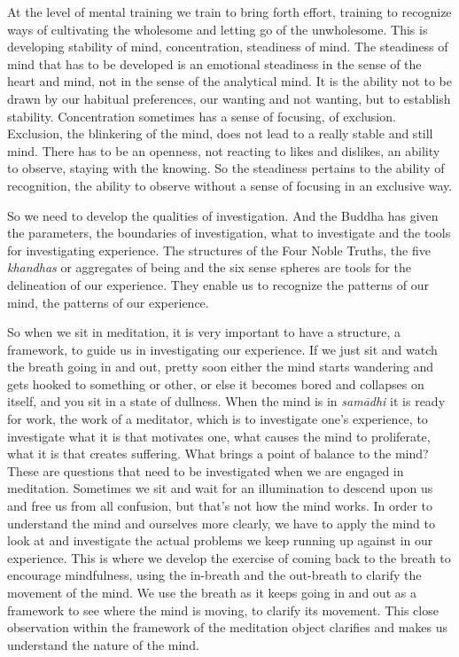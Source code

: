 At the level of mental training we train to bring forth effort, training
to recognize ways of cultivating the wholesome and letting go of the
unwholesome. This is developing stability of mind, concentration, 
steadiness of mind. The steadiness of mind that has to be developed is
an emotional steadiness in the sense of the heart and mind, not in the
sense of the analytical mind. It is the ability not to be drawn by our
habitual preferences, our wanting and not wanting, but to establish
stability. Concentration sometimes has a sense of focusing, of
exclusion. Exclusion, the blinkering of the mind, does not lead to a
really stable and still mind. There has to be an openness, not reacting
to likes and dislikes, an ability to observe, staying with the knowing. 
So the steadiness pertains to the ability of recognition, the ability to
observe without a sense of focusing in an exclusive way. 

So we need to develop the qualities of investigation. And the Buddha has
given the parameters, the boundaries of investigation, what to
investigate and the tools for investigating experience. The structures
of the Four Noble Truths, the five \emph{khandhas} or aggregates of
being and the six sense spheres are tools for the delineation of our
experience. They enable us to recognize the patterns of our mind, the
patterns of our experience. 

So when we sit in meditation, it is very important to have a structure, 
a framework, to guide us in investigating our experience. If we just sit
and watch the breath going in and out, pretty soon either the mind
starts wandering and gets hooked to something or other, or else it
becomes bored and collapses on itself, and you sit in a state of
dullness. When the mind is in \emph{samādhi} it is ready for work, the
work of a meditator, which is to investigate one's experience, to
investigate what it is that motivates one, what causes the mind to
proliferate, what it is that creates suffering. What brings a point of
balance to the mind? These are questions that need to be investigated
when we are engaged in meditation. Sometimes we sit and wait for an
illumination to descend upon us and free us from all confusion, but
that's not how the mind works. In order to understand the mind and
ourselves more clearly, we have to apply the mind to look at and
investigate the actual problems we keep running up against in our
experience. This is where we develop the exercise of coming back to the
breath to encourage mindfulness, using the in-breath and the out-breath
to clarify the movement of the mind. We use the breath as it keeps going
in and out as a framework to see where the mind is moving, to clarify
its movement. This close observation within the framework of the
meditation object clarifies and makes us understand the nature of the
mind. 

